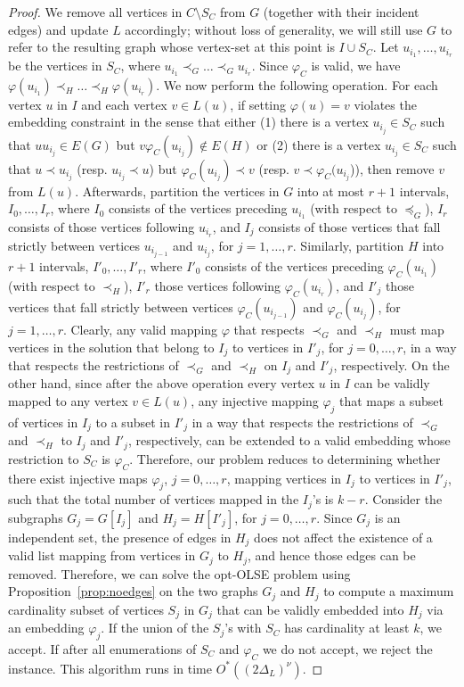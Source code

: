 \documentclass[11pt]{article}
\let\phi=\varphi
\begin{document}
\begin{proof}
We remove all vertices in $C \setminus S_C$ from $G$ (together with their incident edges) and update $L$ accordingly; without loss of generality, we will still use $G$ to refer to the resulting graph whose vertex-set at this point is $I \cup S_C$. Let $u_{i_1}, \ldots, u_{i_r}$ be the vertices in $S_C$, where $u_{i_1} \prec_G \ldots \prec_G u_{i_r}$. Since $\phi_C$ is valid, we have $\phi(u_{i_1}) \prec_H \ldots \prec_H \phi(u_{i_r})$. We now perform the following operation. For each vertex $u$ in $I$ and each vertex $v \in L(u)$, if setting $\phi(u) = v$ violates the embedding constraint in the sense that either (1) there is a vertex $u_{i_j} \in S_C$ such that $uu_{i_j} \in E(G)$ but $v\phi_C(u_{i_j}) \notin E(H)$ or (2) there is a vertex $u_{i_j} \in S_C$ such that $u \prec u_{i_j}$ (resp. $u_{i_j} \prec u$) but $\phi_C(u_{i_j}) \prec v$ (resp. $v \prec \phi_C(u_{i_j}$)), then remove $v$ from $L(u)$. Afterwards, partition the vertices in $G$ into at most $r+1$ intervals, $I_0, \ldots, I_r$, where $I_0$ consists of the vertices preceding $u_{i_1}$ (with respect to $\preceq_G$), $I_r$ consists of those vertices following $u_{i_r}$, and $I_j$ consists of those vertices that fall strictly between vertices $u_{i_{j-1}}$ and $u_{i_j}$, for $j=1, \ldots, r$. Similarly, partition $H$ into $r+1$ intervals, $I'_0, \ldots, I'_r$, where $I'_0$ consists of the vertices preceding $\phi_C(u_{i_1})$ (with respect to $\prec_H$), $I'_r$ those vertices following $\phi_C(u_{i_r})$, and $I'_j$ those vertices that fall strictly between vertices $\phi_C(u_{i_{j-1}})$ and $\phi_C(u_{i_j})$, for $j=1, \ldots, r$. Clearly, any valid mapping $\phi$ that respects $\prec_G$ and $\prec_H$ must map vertices in the solution that belong to $I_j$ to vertices in $I'_j$, for $j=0, \ldots, r$, in a way that respects the restrictions of $\prec_G$ and $\prec_H$ on $I_j$ and $I'_j$, respectively. On the other hand, since after the above operation every vertex $u$ in $I$ can be validly mapped to any vertex $v \in L(u)$, any injective mapping $\phi_j$ that maps a subset of vertices in $I_j$ to a subset in $I'_j$ in a way that respects the restrictions of $\prec_G$ and $\prec_H$ to $I_j$ and $I'_j$, respectively, can be extended to a valid embedding whose restriction to $S_C$ is $\phi_C$. Therefore, our problem reduces to determining whether there exist injective maps $\phi_j$, $j=0, \ldots, r$, mapping vertices in $I_j$ to vertices in $I'_j$, such that the total number of vertices mapped in the $I_j$'s is $k-r$. Consider the subgraphs $G_j=G[I_j]$ and $H_j=H[I'_j]$, for $j=0, \ldots, r$. Since $G_j$ is an independent set, the presence of edges in $H_j$ does not affect the existence of a valid list mapping from vertices in $G_j$ to $H_j$, and hence those edges can be removed. Therefore, we can solve the opt-OLSE problem using Proposition~\ref{prop:noedges} on the two graphs $G_j$ and $H_j$ to compute a maximum cardinality subset of vertices $S_j$ in $G_j$ that can be validly embedded into $H_j$ via an embedding $\phi_j$. If the union of the $S_j$'s with $S_C$ has cardinality at least $k$, we accept. If after all enumerations of $S_C$ and $\phi_C$ we do not accept, we reject the instance. This algorithm runs in time $O^*((2\Delta_L)^{\nu})$. \end{proof}
\end{document}
